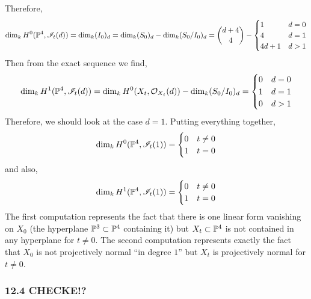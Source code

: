 \documentclass[12pt]{article}
\begin{document}
Therefore,
\[ \dim_{k} H^0(\P^4, \I_t(d)) = \dim_k (I_0)_d = \dim_k (S_0)_d - \dim_{k} (S_0 / I_0)_d = {d + 4 \choose 4} - \begin{cases}
1 & d = 0
\\
4 & d = 1
\\
4 d + 1 & d > 1
\end{cases} \] 
Then from the exact sequence we find,
\[ \dim_k H^1(\P^4, \I_t(d)) = \dim_k H^0(X_t, \struct{X_t}(d)) - \dim_k (S_0/I_0)_d = 
\begin{cases}
0 & d = 0
\\
1 & d = 1
\\
0 & d > 1
\end{cases} \]
Therefore, we should look at the case $d = 1$. Putting everything together,
\[
\dim_k H^0(\P^4, \I_t(1)) = 
\begin{cases}
0 & t \neq 0
\\
1 & t = 0
\end{cases}
\]
and also,
\[ \dim_k H^1(\P^4, \I_t(1)) = 
\begin{cases}
0 & t \neq 0
\\
1 & t = 0
\end{cases} \]
The first computation represents the fact that there is one linear form vanishing on $X_0$ (the hyperplane $\P^3 \subset \P^4$ containing it) but $X_t \subset \P^4$ is not contained in any hyperplane for $t \neq 0$. The second computation represents exactly the fact that $X_0$ is not projectively normal ``in degree $1$'' but $X_t$ is projectively normal for $t \neq 0$.

\subsubsection{12.4 CHECKE!?}
\end{document}
